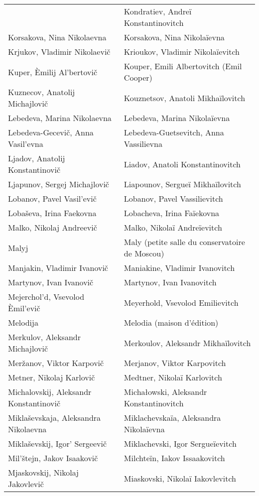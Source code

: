 {\begin{longtable}[c]{ll}
 & Kondratiev, Andreï Konstantinovitch
 \\
 Korsakova, Nina Nikolaevna
 & Korsakova, Nina Nikolaïevna
 \\
 Krjukov, Vladimir Nikolaevič
 & Krioukov, Vladimir Nikolaïevitch
 \\
 Kuper, Èmilij Al'bertovič
 & Kouper, Emili Albertovitch (Emil Cooper)
 \\
 Kuznecov, Anatolij Michajlovič
 & Kouznetsov, Anatoli Mikhaïlovitch
 \\
 Lebedeva, Marina Nikolaevna
 & Lebedeva, Marina Nikolaïevna
 \\
 Lebedeva-Gecevič, Anna Vasil'evna
 & Lebedeva-Guetsevitch, Anna Vassilievna
 \\
 Ljadov, Anatolij Konstantinovič
 & Liadov, Anatoli Konstantinovitch
 \\
 Ljapunov, Sergej Michajlovič
 & Liapounov, Sergueï Mikhaïlovitch
 \\
 Lobanov, Pavel Vasil'evič
 & Lobanov, Pavel Vassilievitch
 \\
 Lobaševa, Irina Faekovna
 & Lobacheva, Irina Faïekovna
 \\
 Malko, Nikolaj Andreevič
 & Malko, Nikolaï Andreïevitch
 \\
 Malyj
 & Maly (petite salle du conservatoire de Moscou)
 \\
 Manjakin, Vladimir Ivanovič
 & Maniakine, Vladimir Ivanovitch
 \\
 Martynov, Ivan Ivanovič
 & Martynov, Ivan Ivanovitch
 \\
 Mejerchol'd, Vsevolod Èmil'evič
 & Meyerhold, Vsevolod Emilievitch
 \\
 Melodija
 & Melodia (maison d'édition)
 \\
 Merkulov, Aleksandr Michajlovič
 & Merkoulov, Aleksandr Mikhaïlovitch
 \\
 Meržanov, Viktor Karpovič
 & Merjanov, Viktor Karpovitch
 \\
 Metner, Nikolaj Karlovič
 & Medtner, Nikolaï Karlovitch
 \\
 Michalovskij, Aleksandr Konstantinovič
 & Michałowski, Aleksandr Konstantinovitch
 \\
 Miklaševskaja, Aleksandra Nikolaevna
 & Miklachevskaïa, Aleksandra Nikolaïevna
 \\
 Miklaševskij, Igor' Sergeevič
 & Miklachevski, Igor Sergueïevitch
 \\
 Mil'štejn, Jakov Isaakovič
 & Milchteïn, Iakov Issaakovitch
 \\
 Mjaskovskij, Nikolaj Jakovlevič
 & Miaskovski, Nikolaï Iakovlevitch

\end{longtable}}
